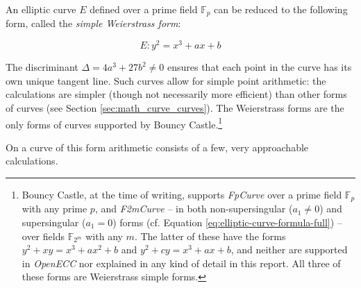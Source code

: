 An elliptic curve \(E\) defined over a prime field \(\mathbb{F}_p\) can be reduced to the following form,
called the \emph{simple Weierstrass form}:

\begin{equation}
	E: y^2 = x^3 + ax + b
\end{equation}

The discriminant \(\Delta = 4a^3 + 27b^2 \neq 0\) ensures that each point in the curve has its own
unique tangent line. Such curves allow for simple point arithmetic: the
calculations are simpler (though not necessarily more efficient) than other forms of curves (see Section \ref{sec:math_curve_curves}). The Weierstrass forms are
the only forms of curves supported by Bouncy Castle.\footnote{Bouncy Castle, at the time of writing,
supports \emph{FpCurve} over a prime field \(\mathbb{F}_p\) with any prime \(p\), and \emph{F2mCurve}
-- in both non-supersingular (\(a_1 \neq 0\)) and supersingular (\(a_1 = 0\)) forms (cf. Equation
\ref{eq:elliptic-curve-formula-full}) -- over fields \(\mathbb{F}_{2^m}\) with any \(m\).
The latter of these have the forms \(y^2 + xy = x^3 + ax^2 + b\) and
\(y^2 + cy = x^3 + ax + b\), and neither are supported in \emph{OpenECC} nor explained in any kind
of detail in this report. All three of these forms are Weierstrass simple forms.\cite{bouncycastle}}

On a curve of this form arithmetic consists of a few, very approachable calculations.